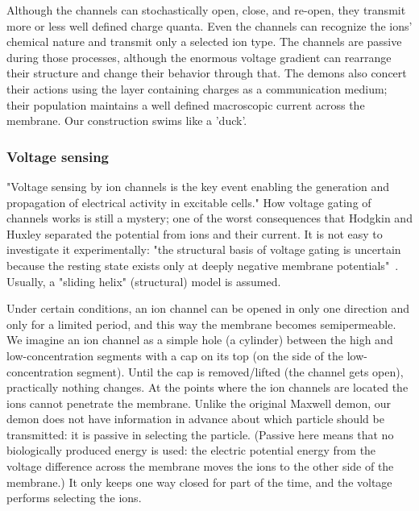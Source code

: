 Although the channels can stochastically open, close, and re-open,
they transmit more or less well defined charge quanta.
Even the channels can
recognize the ions' chemical nature and transmit only a selected ion
type. The channels are passive during those processes, although the enormous
voltage gradient can rearrange their structure and change their behavior through that.
The demons also concert their actions using the layer containing charges
as a communication medium; their population maintains a well defined macroscopic current across the membrane.
Our construction swims like a 'duck'.

\subsubsection{Voltage sensing\label{sec:Electrodiffusion_VoltageSensing}}
"Voltage sensing by ion channels is the key event enabling the generation
and propagation of electrical activity in excitable cells."\cite{VoltageSensingIonChannel:2019}
How voltage gating of channels works is still a mystery; one of the worst consequences that Hodgkin and Huxley separated the potential from ions and their current. It is not
easy to investigate it experimentally: "the structural basis of
voltage gating is uncertain because the resting state exists only
at deeply negative membrane potentials"~\cite{VoltageGatedChannelStructure:2019}.
Usually, a "sliding helix" (structural)
model is assumed.


Under certain conditions, an ion channel can be opened in only one direction and
only for a limited period, and this way the membrane becomes semipermeable.
We imagine an ion channel as a simple hole (a cylinder) between the
high and low-concentration segments with a cap on its top (on the
side of the low-concentration segment). Until the cap is removed/lifted
(the channel gets open), practically nothing changes. At the points
where the ion channels are located
the ions cannot penetrate the
membrane. Unlike the original Maxwell demon, our demon does not have
information in advance about which particle should be transmitted:
it is passive in selecting the particle. 
(Passive here means that no biologically produced energy is used:
the electric potential energy from the voltage difference across the membrane moves the ions to the other side of the membrane.)
It only keeps one way closed
for part of the time, and the voltage performs selecting the ions.


